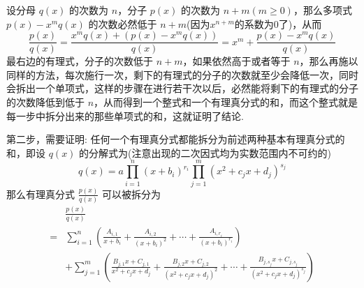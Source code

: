 设分母 $q(x)$ 的次数为 $n$，分子 $p(x)$ 的次数为 $n+m(m \geqslant 0)$，那么多项式 $p(x)-x^m q(x)$ 的次数必然低于 $n+m$(因为$x^{n+m}$的系数为0了)，从而
\[ \frac{p(x)}{q(x)} = \frac{x^m q(x) + (p(x)-x^m q(x))}{q(x)} = x^m + \frac{p(x)-x^m q(x)}{q(x)} \]
最右边的有理式，分子的次数低于 $n+m$，如果依然高于或者等于 $n$，那么再施以同样的方法，每次施行一次，剩下的有理式的分子的次数就至少会降低一次，同时会拆出一个单项式，这样的步骤在进行若干次以后，必然能将剩下的有理式的分子的次数降低到低于 $n$，从而得到一个整式和一个有理真分式的和，而这个整式就是每一步中拆分出来的那些单项式的和，这就证明了结论.

第二步，需要证明: 任何一个有理真分式都能拆分为前述两种基本有理真分式的和，即设 $q(x)$ 的分解式为(注意出现的二次因式均为实数范围内不可约的)
\[ q(x) = a \prod_{i=1}^n(x+b_i)^{r_i} \prod_{j=1}^m(x^2+c_j x + d_j)^{s_j} \]
那么有理真分式 $\frac{p(x)}{q(x)}$ 可以被拆分为
\begin{align*}
 & \frac{p(x)}{q(x)} \\
 = & \sum_{i=1}^{n} \left( \frac{A_{i,1}}{x+b_i} + \frac{A_{i,2}}{(x+b_i)^2} + \cdots + \frac{A_{i,r_i}}{(x+b_i)^{r_i}}  \right) \\
 & + \sum_{j=1}^m \left( \frac{B_{j,1}x+C_{j,1}}{x^2+c_j x + d_j} + \frac{B_{j,2}x+C_{j,2}}{(x^2+c_j x + d_j)^2} + \cdots + \frac{B_{j,s_j}x+C_{j,s_j}}{(x^2+c_j x + d_j)^{s_j}} \right)
\end{align*}

